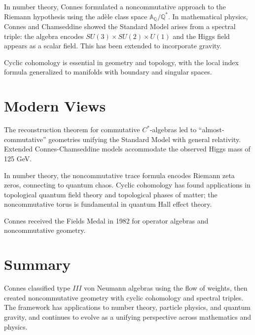 In number theory, Connes formulated a noncommutative approach to the
Riemann hypothesis using the adèle class space
$\mathbb{A}_\mathbb{Q}/\mathbb{Q}^*$. In mathematical physics, Connes
and Chamseddine showed the Standard Model arises from a spectral triple:
the algebra encodes $SU(3) \times SU(2) \times U(1)$ and the Higgs
field appears as a scalar field. This has been extended to incorporate
gravity.

Cyclic cohomology is essential in geometry and topology, with the local
index formula generalized to manifolds with boundary and singular spaces.

\section*{Modern Views}

The reconstruction theorem for commutative $C^*$-algebras led to
``almost-commutative'' geometries unifying the Standard Model with
general relativity. Extended Connes-Chamseddine models accommodate the
observed Higgs mass of 125 GeV.

In number theory, the noncommutative trace formula encodes Riemann zeta
zeros, connecting to quantum chaos. Cyclic cohomology has found
applications in topological quantum field theory and topological phases
of matter; the noncommutative torus is fundamental in quantum Hall effect
theory.

Connes received the Fields Medal in 1982 for operator algebras and
noncommutative geometry.

\section*{Summary}
Connes classified type $III$ von Neumann algebras using the flow of
weights, then created noncommutative geometry with cyclic cohomology and
spectral triples. The framework has applications to number theory,
particle physics, and quantum gravity, and continues to evolve as a
unifying perspective across mathematics and physics.

